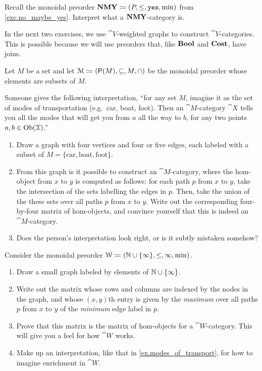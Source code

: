 \documentclass[7Sketches]{subfiles}
\begin{document}
\begin{exercise}%
\label{exc.NMY_cats}
Recall the monoidal preorder $\mathbf{NMY}\coloneqq(P,\leq,\mathtt{yes},\min)$ from
\cref{exc.no_maybe_yes}. Interpret what a $\mathbf{NMY}$-category is.
\end{exercise}

In the next two exercises, we use $\cat{V}$-weighted graphs to construct
$\cat{V}$-categories. This is possible because we will use preorders that, like
$\mathbf{Bool}$ and $\mathbf{Cost}$, have joins.

\begin{exercise}%
\label{ex.modes_of_transport}%
Let $M$ be a set and let $\mathcal{M}\coloneqq(\mathsf{P}(M),\subseteq,M,\cap)$ be the monoidal preorder whose elements are subsets of $M$.

Someone gives the following interpretation, ``for any set $M$, imagine it as the set of modes of transportation (e.g.\ car, boat, foot). Then an $\cat{M}$-category $\cat{X}$ tells you all the modes that will get you from $a$ all the way to $b$, for any two points $a,b\in\operatorname{Ob}(\mathcal{X})$.''
\begin{enumerate}
	\item Draw a graph with four vertices and four or five edges, each labeled with a subset of $M=\{\mathrm{car}, \mathrm{boat}, \mathrm{foot}\}$.	
	\item From this graph is it possible to construct an $\cat{M}$-category,
	where the hom-object from $x$ to $y$ is computed as follows: for each
	path $p$ from $x$ to $y$, take the intersection of the sets
	labelling the edges in $p$. Then, take the union of the these sets over
	all paths $p$ from $x$ to $y$. Write out the corresponding four-by-four
	matrix of hom-objects, and convince yourself that this is indeed an
	$\cat{M}$-category.%
%
	\item Does the person's interpretation look right, or is it subtly mistaken somehow?
	\qedhere
\end{enumerate}
\end{exercise}


\begin{exercise}%
\label{exc.weight_limit}
Consider the monoidal preorder $\mathcal{W}\coloneqq(\mathbb{N}\cup\{\infty\}, \leq, \infty,
\min)$.
\begin{enumerate}
	\item Draw a small graph labeled by elements of $\mathbb{N}\cup\{\infty\}$. 
	\item Write out the matrix whose rows and columns are indexed by the
	nodes in the graph, and whose $(x,y)$th entry is given by the
	\emph{maximum} over all paths $p$ from $x$ to $y$ of the \emph{minimum}
	edge label in $p$.  
	\item Prove that this matrix is the matrix of hom-objects for a
	$\cat{W}$-category. This will give you a feel for how $\cat{W}$ works.%
	\item Make up an interpretation, like that in
	\cref{ex.modes_of_transport}, for how to imagine enrichment in
	$\cat{W}$.
	\qedhere
\end{enumerate}
\end{exercise}
\end{document}
